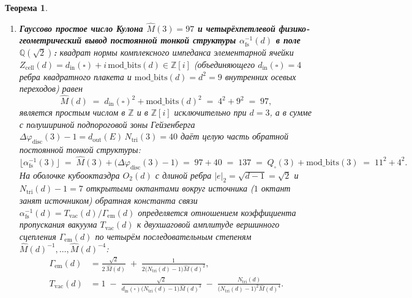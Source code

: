 \documentclass[11pt,a4paper]{article}
\theoremstyle{plain}
\newtheorem{theorem}{Теорема}[section]
\theoremstyle{definition}
\begin{document}
\begin{theorem}
\begin{enumerate}[label=\textbf{(\arabic*)},leftmargin=*]
\item \textbf{Гауссово простое число Кулона $\widehat{M}(3) = 97$ и четырёхпетлевой физико-геометрический вывод постоянной тонкой структуры $\alpha_{\mathrm{fs}}^{-1}(d)$ в поле $\mathbb{Q}(\sqrt{2})$:}
  квадрат нормы комплексного импеданса элементарной ячейки $Z_{\mathrm{cell}}(d) = d_{\mathrm{in}}(\square) + i\,\mathrm{mod\_bits}(d) \in \mathbb{Z}[i]$ (объединяющего $d_{\mathrm{in}}(\square) = 4$ ребра квадратного плакета и $\mathrm{mod\_bits}(d) = d^2 = 9$ внутренних осевых переходов) равен
  \begin{equation}
    \label{eq:mhat-97-def}
    \widehat{M}(d) \;=\; d_{\mathrm{in}}(\square)^2 + \mathrm{mod\_bits}(d)^2 \;=\; 4^2 + 9^2 \;=\; 97,
  \end{equation}
  является простым числом в $\mathbb{Z}$ и в $\mathbb{Z}[i]$ исключительно при $d = 3$, а в сумме с полушириной подпороговой зоны Гейзенберга $\Delta\varphi_{\mathrm{disc}}(3) - 1 = d_{\mathrm{out}}(E)\,N_{\mathrm{tri}}(3) = 40$ даёт целую часть обратной постоянной тонкой структуры:
  \begin{equation}
    \label{eq:alpha-floor-137}
    \bigl\lfloor\alpha_{\mathrm{fs}}^{-1}(3)\bigr\rfloor \;=\; \widehat{M}(3) + \bigl(\Delta\varphi_{\mathrm{disc}}(3) - 1\bigr) \;=\; 97 + 40 \;=\; 137 \;=\; Q_\square(3) + \mathrm{mod\_bits}(3) \;=\; 11^2 + 4^2.
  \end{equation}
  На оболочке кубооктаэдра $O_2(d)$ с длиной ребра $|e|_2 = \sqrt{d-1} = \sqrt{2}$ и $N_{\mathrm{tri}}(d) - 1 = 7$ открытыми октантами вокруг источника ($1$ октант занят источником) обратная константа связи $\alpha_{\mathrm{fs}}^{-1}(d) = T_{\mathrm{vac}}(d) / \Gamma_{\mathrm{em}}(d)$ определяется отношением коэффициента пропускания вакуума $T_{\mathrm{vac}}(d)$ к двухшаговой амплитуде вершинного сцепления $\Gamma_{\mathrm{em}}(d)$ по четырём последовательным степеням $\widehat{M}(d)^{-1}, \dots, \widehat{M}(d)^{-4}$:
  \begin{align}
    \Gamma_{\mathrm{em}}(d) &= \frac{\sqrt{2}}{2\,\widehat{M}(d)} \;+\; \frac{1}{2\bigl(N_{\mathrm{tri}}(d) - 1\bigr)\widehat{M}(d)^2}, \label{eq:alpha-gamma-denom} \\
    T_{\mathrm{vac}}(d) &= 1 \;-\; \frac{\sqrt{2}}{d_{\mathrm{in}}(\square)\bigl(N_{\mathrm{tri}}(d) - 1\bigr)\widehat{M}(d)^3} \;-\; \frac{N_{\mathrm{tri}}(d)}{\bigl(N_{\mathrm{tri}}(d) - 1\bigr)^2\widehat{M}(d)^4}. \label{eq:alpha-tvac-numer}
  \end{align}

\end{enumerate}
\end{theorem}
\end{document}
